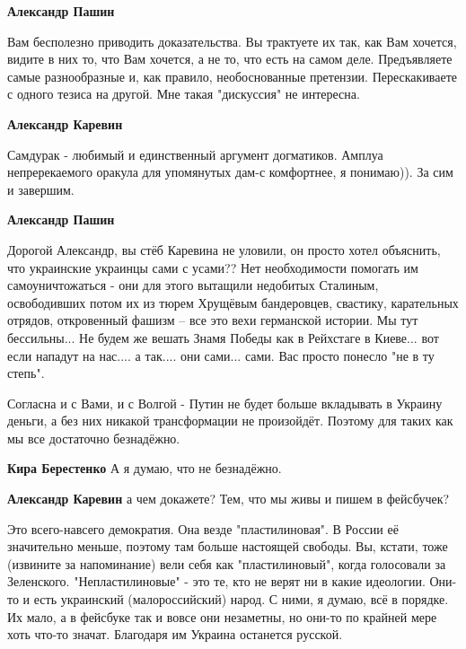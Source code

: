 \begin{itemize}
\begin{itemize}
\textbf{Александр Пашин} 

Вам бесполезно приводить доказательства. Вы трактуете их так, как Вам хочется,
видите в них то, что Вам хочется, а не то, что есть на самом деле. Предъявляете
самые разнообразные и, как правило, необоснованные претензии. Перескакиваете с
одного тезиса на другой. Мне такая "дискуссия" не интересна.


\textbf{Александр Каревин} 

Самдурак - любимый и единственный аргумент догматиков. Амплуа непререкаемого
оракула для упомянутых дам-с комфортнее, я понимаю)). За сим и завершим.


\textbf{Александр Пашин} 

Дорогой Александр, вы стёб Каревина не уловили, он просто хотел объяснить, что
украинские украинцы сами с усами?? Нет необходимости помогать им
самоуничтожаться - они для этого вытащили недобитых Сталиным, освободивших
потом их из тюрем Хрущёвым бандеровцев, свастику, карательных отрядов,
откровенный фашизм – все это вехи германской истории. Мы тут бессильны... Не
будем же вешать Знамя Победы как в Рейхстаге в Киеве... вот если нападут на
нас.... а так.... они сами... сами. Вас просто понесло "не в ту степь".

\end{itemize} %


Согласна и с Вами, и с Волгой - Путин не будет больше вкладывать в Украину
деньги, а без них никакой трансформации не произойдёт. Поэтому для таких как мы
все достаточно безнадёжно.

\begin{itemize} %
\textbf{Кира Берестенко} А я думаю, что не безнадёжно.

\textbf{Александр Каревин} а чем докажете? Тем, что мы живы и пишем в фейсбучек?


Это всего-навсего демократия. Она везде "пластилиновая". В России её
значительно меньше, поэтому там больше настоящей свободы. Вы, кстати, тоже
(извините за напоминание) вели себя как "пластилиновый", когда голосовали за
Зеленского. "Непластилиновые" - это те, кто не верят ни в какие идеологии.
Они-то и есть украинский (малороссийский) народ. С ними, я думаю, всё в
порядке. Их мало, а в фейсбуке так и вовсе они незаметны, но они-то по крайней
мере хоть что-то значат. Благодаря им Украина останется русской.


\end{itemize}
\end{itemize}
